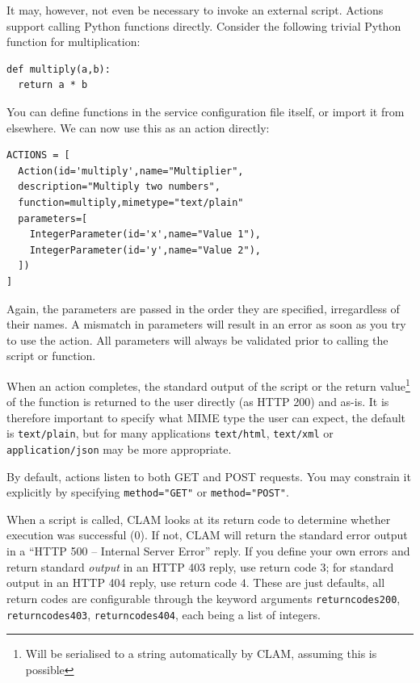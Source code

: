 \documentclass[a4paper,12pt,twoside,openright]{report}
\begin{document}
It may, however, not even be necessary to invoke an external script. Actions
support calling Python functions directly. Consider the following trivial Python
function for multiplication:

{ \small
\begin{verbatim}
def multiply(a,b):
  return a * b
\end{verbatim}
}

You can define functions in the service configuration file itself, or import it
from elsewhere. We can now use this as an action directly:

{ \small
\begin{verbatim}
ACTIONS = [
  Action(id='multiply',name="Multiplier",
  description="Multiply two numbers",
  function=multiply,mimetype="text/plain"
  parameters=[
    IntegerParameter(id='x',name="Value 1"),
    IntegerParameter(id='y',name="Value 2"),
  ])
]
\end{verbatim}
}

Again, the parameters are passed in the order they are specified, irregardless
of their names. A mismatch in parameters will result in an error as soon as you
try to use the action. All parameters will always be validated prior to calling the
script or function.

When an action completes, the standard output of the script or the return
value\footnote{Will be serialised to a string automatically by CLAM, assuming
this is possible} of the function is returned to the user directly (as HTTP 200) and as-is.
It is therefore important to specify what MIME type the user can expect, the
default is \texttt{text/plain}, but for many applications \texttt{text/html}, \texttt{text/xml} or
\texttt{application/json} may be more appropriate.

By default, actions listen to both GET and POST requests. You may constrain it
explicitly by specifying \texttt{method="GET"} or \texttt{method="POST"}.

When a script is called, CLAM looks at its return code to determine whether
execution was successful ($0$). If not, CLAM will return the standard error
output in a ``HTTP 500 -- Internal Server Error'' reply. If you define your own
errors and return standard \emph{output} in an HTTP 403 reply, use return code
$3$; for standard output in an HTTP 404 reply, use return code $4$. These are just defaults, all return
codes are configurable through the keyword arguments \texttt{returncodes200},
\texttt{returncodes403}, \texttt{returncodes404}, each being a list of
integers.
\end{document}
